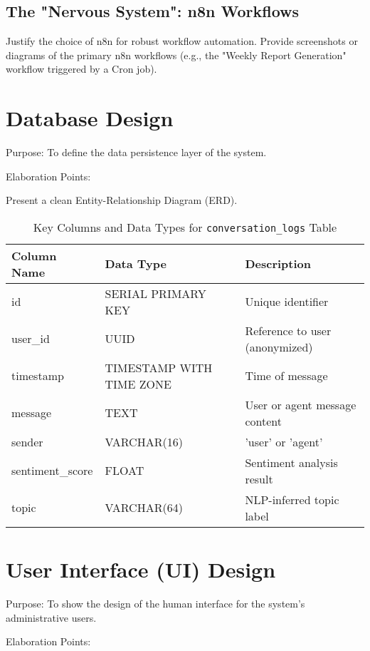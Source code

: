 \subsection{The "Nervous System": n8n Workflows} 
Justify the choice of n8n for robust workflow automation. Provide screenshots or diagrams of the primary n8n workflows (e.g., the "Weekly Report Generation" workflow triggered by a Cron job).

\section{Database Design}
Purpose: To define the data persistence layer of the system.

Elaboration Points:

Present a clean Entity-Relationship Diagram (ERD).

\begin{table}[h]
    \centering
    \caption{Key Columns and Data Types for \texttt{conversation\_logs} Table}
    \label{tab:conversation-logs}
    \begin{tabular}{|l|l|l|}
        \hline
        \textbf{Column Name} & \textbf{Data Type} & \textbf{Description} \\
        \hline
        id & SERIAL PRIMARY KEY & Unique identifier \\
        user\_id & UUID & Reference to user (anonymized) \\
        timestamp & TIMESTAMP WITH TIME ZONE & Time of message \\
        message & TEXT & User or agent message content \\
        sender & VARCHAR(16) & 'user' or 'agent' \\
        sentiment\_score & FLOAT & Sentiment analysis result \\
        topic & VARCHAR(64) & NLP-inferred topic label \\
        \hline
    \end{tabular}
\end{table}

\section{User Interface (UI) Design}
Purpose: To show the design of the human interface for the system's administrative users.

Elaboration Points:

